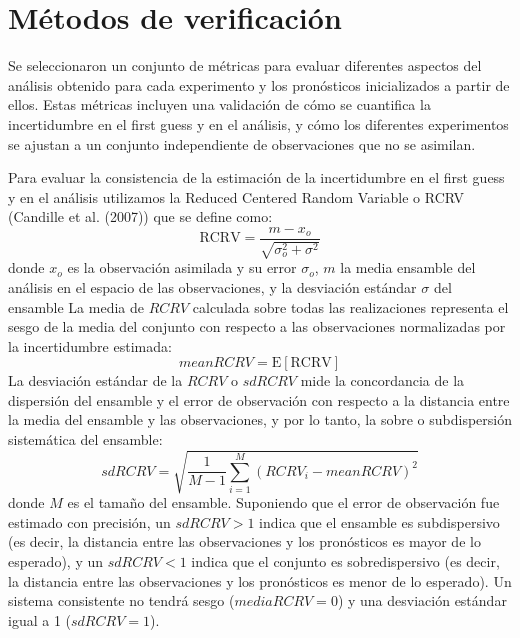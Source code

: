\documentclass[12pt,oneside]{reedthesis}
\begin{document}
\hypertarget{muxe9todos-de-verificaciuxf3n}{%
\section{Métodos de verificación}\label{muxe9todos-de-verificaciuxf3n}}

Se seleccionaron un conjunto de métricas para evaluar diferentes aspectos del análisis obtenido para cada experimento y los pronósticos inicializados a partir de ellos. Estas métricas incluyen una validación de cómo se cuantifica la incertidumbre en el first guess y en el análisis, y cómo los diferentes experimentos se ajustan a un conjunto independiente de observaciones que no se asimilan.

Para evaluar la consistencia de la estimación de la incertidumbre en el first guess y en el análisis utilizamos la Reduced Centered Random Variable o RCRV (Candille et al. (2007)) que se define como:
\begin{equation}
\mathrm{RCRV} = \frac{m - x_o}{\sqrt{\sigma_o^2 + \sigma^2}}
\label{eq:eq6}
\end{equation}
donde \(x_o\) es la observación asimilada y su error \(\sigma_o\), \(m\) la media ensamble del análisis en el espacio de las observaciones, y la desviación estándar \(\sigma\) del ensamble
La media de \(RCRV\) calculada sobre todas las realizaciones representa el sesgo de la media del conjunto con respecto a las observaciones normalizadas por la incertidumbre estimada:
\begin{equation}
\mathrm{\mathit{mean RCRV} = E[RCRV]}
\label{eq:eq7}
\end{equation}
La desviación estándar de la \(RCRV\) o \(sd RCRV\) mide la concordancia de la dispersión del ensamble y el error de observación con respecto a la distancia entre la media del ensamble y las observaciones, y por lo tanto, la sobre o subdispersión sistemática del ensamble:
\begin{equation}
\mathit{sd RCRV} = \sqrt{\frac{1}{M -1}\sum_{i=1}^{M}(RCRV_i - \mathit{mean RCRV})^2}
\label{eq:eq8}
\end{equation}
donde \(M\) es el tamaño del ensamble. Suponiendo que el error de observación fue estimado con precisión, un \(sd RCRV > 1\) indica que el ensamble es subdispersivo (es decir, la distancia entre las observaciones y los pronósticos es mayor de lo esperado), y un \(sd RCRV < 1\) indica que el conjunto es sobredispersivo (es decir, la distancia entre las observaciones y los pronósticos es menor de lo esperado). Un sistema consistente no tendrá sesgo (\(media RCRV = 0\)) y una desviación estándar igual a 1 (\(sd RCRV = 1\)).
\end{document}
